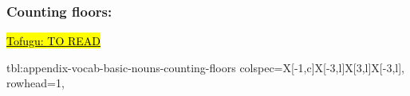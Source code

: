 \documentclass[../nihongo-gakushuu-kyouzai.tex]{subfiles}
\begin{document}
\subsubsection{Counting floors: }
\href{https://www.tofugu.com/japanese/japanese-counter-kai-floors/}{\hl{Tofugu: TO READ}}

{tbl:appendix-vocab-basic-nouns-counting-floors}  %
{
    colspec={X[-1,c]X[-3,l]X[3,l]X[-3,l]},
    rowhead=1,
}  %
\end{document}
